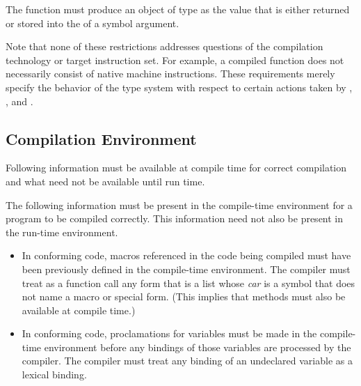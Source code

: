 The function  must produce an object of type
       as the value that is either returned
or stored into the  of a symbol argument.

Note that none of these restrictions addresses questions of the compilation technology or
target instruction set.  For example, a compiled function does not necessarily consist of
native machine instructions.  These requirements merely specify the behavior of the type
system with respect to certain actions taken by , , and
.

\subsection{Compilation Environment}

Following information must be available at compile time
for correct compilation
and what need not be available until run time.

The following information must be present in the compile-time
environment for a program to be compiled correctly.  This
information need not also be present in the run-time environment.
\begin{itemize}
\item In conforming code, macros referenced in the code being compiled
        must have been previously defined in the compile-time environment.
	The compiler must treat as a function call any form that is a list whose \emph{car} is
	a symbol that does not name a macro or special form.
  (This implies that  methods must also be available at
	compile time.)

\item In conforming code, proclamations for  variables must
        be made in the compile-time environment before any bindings of
        those variables are processed by the compiler.  The compiler
        must treat any binding of an undeclared variable as a lexical
        binding.
\end{itemize}



